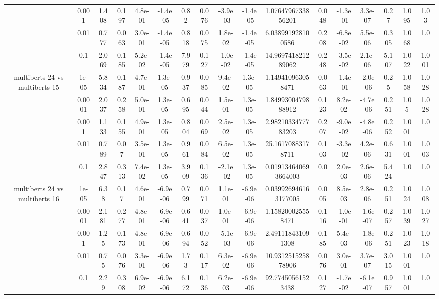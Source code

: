 \begin{tabular}{|c|c|c|c|c|c|c|c|c|c|c|c|c|c|c|c|c|}
 & 0.001 & 1.408 & 0.197 & 4.8e-01 & -1.4e-05 & 0.82 & 0.076 & -3.9e-03 & -1.4e-05 & 1.0764796733856201 & 0.048 & -1.3e-01 & 3.3e-07 & 0.27 & 1.095 & 1.03 \\
 & 0.01 & 0.777 & 0.063 & 3.0e-01 & -1.4e-05 & 0.818 & 0.075 & 1.8e-02 & -1.4e-05 & 6.038991928100586 & 0.208 & -6.8e-02 & 5.5e-06 & 0.305 & 1.068 & 1.0 \\
 & 0.1 & 2.069 & 0.185 & 5.2e-02 & -1.4e-05 & 7.979 & 0.127 & -1.0e-02 & -1.4e-05 & 14.969741821289062 & 0.248 & -3.5e-02 & 2.1e-06 & 5.107 & 1.022 & 1.001 \\
\hline
\multirow{5}{*}{multiberts 24 vs multiberts 15} & 1e-05 & 5.834 & 0.187 & 4.7e-01 & 1.3e-05 & 0.937 & 0.085 & 9.4e-02 & 1.3e-05 & 1.149410963058471 & 0.063 & -1.4e-01 & -2.0e-06 & 0.25 & 1.058 & 1.028 \\
 & 0.0001 & 2.037 & 0.258 & 5.0e-01 & 1.3e-05 & 0.695 & 0.044 & 1.5e-01 & 1.3e-05 & 1.8499300479888912 & 0.123 & 8.2e-02 & -4.7e-06 & 0.251 & 1.05 & 1.028 \\
 & 0.001 & 1.133 & 0.155 & 4.9e-01 & 1.3e-05 & 0.804 & 0.069 & 2.5e-02 & 1.3e-05 & 2.9821033477783203 & 0.207 & -9.0e-02 & -4.8e-06 & 0.252 & 1.001 & 1.0 \\
 & 0.01 & 0.789 & 0.07 & 3.5e-01 & 1.3e-05 & 0.961 & 0.084 & 6.5e-02 & 1.3e-05 & 25.16170883178711 & 0.103 & -3.3e-02 & 4.2e-06 & 0.631 & 1.001 & 1.003 \\
 & 0.1 & 2.847 & 0.313 & 7.4e-02 & 1.3e-05 & 3.909 & 0.136 & -2.1e-02 & 1.3e-05 & 0.019134640693664003 & 0.0 & 2.0e-03 & 2.6e-06 & 5.424 & 1.0 & 1.0 \\
\hline
\multirow{5}{*}{multiberts 24 vs multiberts 16} & 1e-05 & 6.38 & 0.17 & 4.6e-01 & -6.9e-06 & 0.799 & 0.071 & 1.1e-01 & -6.9e-06 & 0.039926946163177005 & 0.005 & 8.5e-03 & 2.8e-06 & 0.251 & 1.024 & 1.008 \\
 & 0.0001 & 2.181 & 0.277 & 4.8e-01 & -6.9e-06 & 0.641 & 0.037 & 1.0e-01 & -6.9e-06 & 1.158200025558471 & 0.116 & -1.0e-01 & -1.6e-07 & 0.257 & 1.039 & 1.027 \\
 & 0.001 & 1.25 & 0.173 & 4.8e-01 & -6.9e-06 & 0.694 & 0.052 & -5.1e-03 & -6.9e-06 & 2.491118431091308 & 0.185 & 5.4e-03 & -1.8e-06 & 0.251 & 1.023 & 1.018 \\
 & 0.01 & 0.75 & 0.076 & 3.3e-01 & -6.9e-06 & 1.73 & 0.117 & 6.3e-02 & -6.9e-06 & 10.931251525878906 & 0.076 & 3.0e-01 & 3.7e-07 & 3.015 & 1.001 & 1.0 \\
 & 0.1 & 2.29 & 0.308 & 6.9e-02 & -6.9e-06 & 6.172 & 0.136 & 6.2e-03 & -6.9e-06 & 92.77450561523438 & 0.127 & -1.7e-02 & -6.1e-07 & 0.957 & 1.001 & 1.0 \\

\end{tabular}
